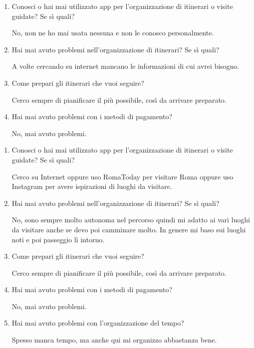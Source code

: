 
\begin{enumerate}

\item Conosci o hai mai utilizzato app per l'organizzazione di itinerari o visite guidate? Se sì quali?

No, non ne ho mai usata nessuna e non le conosco personalmente.

\item Hai mai avuto problemi nell'organizzazione di itinerari? Se sì quali?

A volte cercando su internet mancano le informazioni di cui avrei bisogno.

\item Come prepari gli itinerari che vuoi seguire?

Cerco sempre di pianificare il più possibile, così da arrivare preparato.

\item Hai mai avuto problemi con i metodi di pagamento?

No, mai avuto problemi.

\end{enumerate}


\begin{enumerate}

\item Conosci o hai mai utilizzato app per l'organizzazione di itinerari o visite guidate? Se sì quali?

Cerco su Internet oppure uso RomaToday per visitare Roma oppure uso Instagram per avere ispirazioni di luoghi da visitare.

\item Hai mai avuto problemi nell'organizzazione di itinerari? Se sì quali?

No, sono sempre molto autonoma nel percorso quindi mi adatto ai vari luoghi da visitare anche se devo poi camminare molto. In genere mi baso sui luoghi noti e poi passeggio lì intorno.

\item Come prepari gli itinerari che vuoi seguire?

Cerco sempre di pianificare il più possibile, così da arrivare preparato.

\item Hai mai avuto problemi con i metodi di pagamento?

No, mai avuto problemi.

\item Hai mai avuto problemi con l'organizzazione del tempo?

Spesso manca tempo, ma anche qui mi organizzo abbastanza bene.

\end{enumerate}

